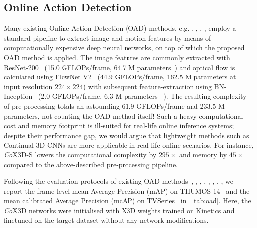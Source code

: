 
\subsection{Online Action Detection} \label{sec:exp-oad}
Many existing Online Action Detection (OAD) methods, e.g. \cite{gao2017red}, \cite{xu2019temporal}, \cite{Eun2020LearningTD}, \cite{wang2021oadtr}, employ a standard pipeline to extract image and motion features by means of computationally expensive deep neural networks, on top of which the proposed OAD method is applied.
The image features are commonly extracted with ResNet-200~\cite{he2016resnet} (15.0 GFLOPs/frame, 64.7 M parameters~\cite{wang2017residual}) and optical flow is calculated using FlowNet V2~\cite{ilg2017flownet2} (44.9 GFLOPs/frame, 162.5 M parameters at input resolution $224 \times 224$) with subsequent feature-extraction using BN-Inception~\cite{ioffe2015batch} (2.0 GFLOPs/frame, 6.3 M parameters ~\cite{bianco2018benchmark}).
The resulting complexity of pre-processing totals an astounding 61.9 GFLOPs/frame and 233.5 M parameters, not counting the OAD method itself!
Such a heavy computational cost and memory footprint is ill-suited for real-life online inference systems; despite their performance gap, we would argue that lightweight methods such as Continual 3D CNNs are more applicable in real-life online scenarios.
For instance, \textit{Co}X3D-S lowers the computational complexity by $295\times$ and memory by $45\times$ compared to the above-described pre-processing pipeline.

Following the evaluation protocols of existing OAD methods~\cite{gao2017red}, \cite{xu2019temporal}, \cite{kim2021temporally}, \cite{Eun2020LearningTD}, \cite{wu2019long}, \cite{xu2021long}, \cite{wang2021oadtr}, \cite{Zhao2020PrivilegedKD}, we report the frame-level mean Average Precision (mAP) on THUMOS-14~\cite{idrees2017thumos} and the mean calibrated Average Precision (mcAP) on TVSeries~\cite{geest2016online} in ~\cref{tab:oad}. Here, the \textit{Co}X3D networks were initialised with X3D weights trained on Kinetics and finetuned on the target dataset without any network modifications.



